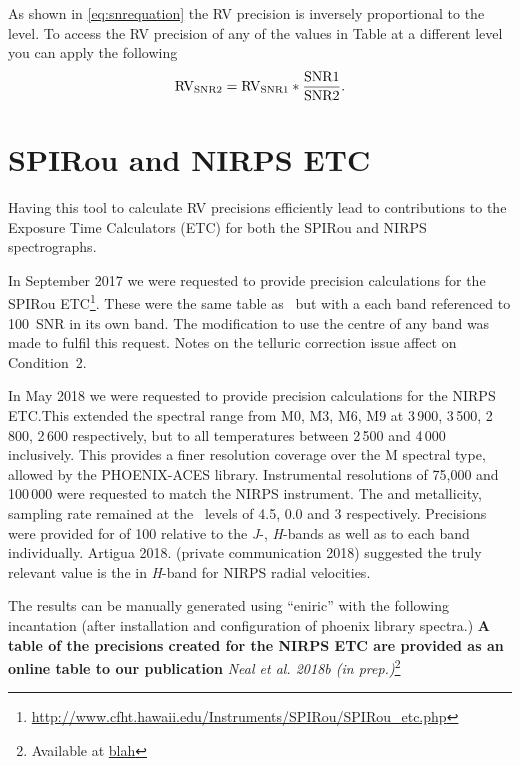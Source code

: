 As shown in \cref{eq:snrequation} the {RV} precision is inversely proportional to the \snr{} level.
To access the {RV} precision of any of the values in Table at a different \snr{} level you can apply the following
\begin{equation}
\rm RV_{SNR2} = RV_{SNR1} * \frac{SNR1}{SNR2}.
\end{equation}

\section{{SPIRou} and {NIRPS} {ETC}}\label{sec:spirou_nirps_etc}
Having this tool to calculate {RV} precisions efficiently lead to contributions to the Exposure Time Calculators (ETC) for both the {SPIRou} and {NIRPS} spectrographs.

In September 2017 we were requested to provide precision calculations for the {SPIRou} ETC\footnote{\url{http://www.cfht.hawaii.edu/Instruments/SPIRou/SPIRou_etc.php}}.
These were the same table as~\citet{figueira_radial_2016} but with a each band referenced to 100~{SNR} in its own band.
The modification to use the centre of any band was made to fulfil this request.
Notes on the telluric correction issue affect on Condition~2.

In May 2018 we were requested to provide precision calculations for the {NIRPS} {ETC}.\@ This extended the spectral range from {M0}, {M3}, {M6}, {M9} at 3\,900, 3\,500, 2\,800, 2\,600\K{} respectively, but to all temperatures between 2\,500 and 4\,000\K{} inclusively.
This provides a finer resolution coverage over the M spectral type, allowed by the {PHOENIX-ACES} library.
Instrumental resolutions of 75,000 and 100\,000 were requested to match the {NIRPS} instrument.
The \logg{} and metallicity, sampling rate remained at the~\citet{figueira_radial_2016} levels of 4.5, 0.0 and 3 respectively.
Precisions were provided for \snr{} of 100 relative to the \emph{J}-, \emph{H}-bands as well as to each band individually.
Artigua 2018. (private communication 2018) suggested the truly relevant value is the \snr{} in \emph{H}-band for {NIRPS} radial velocities.

The results can be manually generated using ``eniric'' with the following incantation (after installation and configuration of phoenix library spectra.)
\textbf{A table of the precisions created for the {NIRPS} ETC are provided as an online table to our publication} \textit{Neal et al.
2018b (in prep.)}\footnote{Available at \href{blah}{blah}} 


